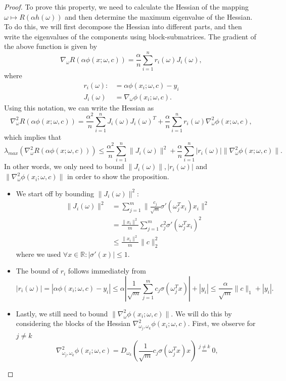 \documentclass[10pt,a4paper]{amsart}
\newcommand{\bR}{\mathbb{R}}
\begin{document}
\begin{proof}
    To prove this property, we need to calculate the Hessian of the mapping $\omega \mapsto R(\alpha h(\omega))$ and then determine the maximum eigenvalue of the Hessian. To do this, we will first decompose the Hessian into different parts, and then write the eigenvalues of the components using block-submatrices. 
    The gradient of the above function is given by
    $$\nabla_\omega R(\alpha \phi(x;\omega,c))=\frac{\alpha}{n}\sum_{i=1}^nr_i(\omega)J_i(\omega),$$
    where 
    \begin{align*}
        r_i(\omega):&=\alpha \phi(x_i;\omega,c)-y_i\\
        J_i(\omega)&=\nabla_\omega \phi(x_i;\omega,c).
    \end{align*}
    Using this notation, we can write the Hessian as 
    $$\nabla^2_\omega R(\alpha \phi(x;\omega,c))=\frac{\alpha^2}{n}\sum_{i=1}^nJ_i(\omega)J_i(\omega)^T+\frac{\alpha}{n}\sum_{i=1}^nr_i(\omega)\nabla^2_\omega\phi(x;\omega,c),$$
    which implies that 
    $$\lambda_{max}\left(\nabla^2_\omega R(\alpha \phi(x;\omega,c))\right)\leq\frac{\alpha^2}{n}\sum_{i=1}^n\|J_i(\omega)\|^2+\frac{\alpha}{n}\sum_{i=1}^n|r_i(\omega)|\|\nabla^2_\omega\phi(x;\omega,c)\|.$$
    In other words, we only need to bound $\|J_i(\omega)\|,|r_i(\omega)|$ and $\|\nabla^2_\omega \phi(x_i;\omega,c)\|$ in order to show the proposition. 
    \begin{itemize}
        \item We start off by bounding $\|J_i(\omega)\|^2$:
        \begin{align*}
            \|J_i(\omega)\|^2&= \sum_{j=1}^m\|\frac{c_j}{\sqrt{m}}\sigma'(\omega_j^T x_i)x_i\|^2\\
            &=\frac{\|x_i\|^2}{m}\sum_{j=1}^mc_j^2\sigma'(\omega_j^Tx_i)^2\\
            &\leq \frac{\|x_i\|^2}{m}\|c\|_2^2
        \end{align*}
        where we used $\forall x\in \bR:|\sigma'(x)|\leq 1$.
        \item The bound of $r_i$ follows immediately from  $$|r_i(\omega)|=|\alpha\phi(x_i;\omega,c)-y_i|\leq \alpha|\frac{1}{\sqrt{m}}\sum_{j=1}^m c_j\sigma(\omega_j^Tx)|+|y_i|\leq \frac{\alpha}{\sqrt{m}}\|c\|_1+|y_i|.$$
        \item Lastly, we still need to bound $\|\nabla^2_\omega \phi(x_i;\omega,c)\|$. We will do this by considering the blocks of the Hessian $\nabla^2_{\omega_j,\omega_k}\phi(x_i;\omega,c)$. First, we observe for $j\neq k$ 
        $$\nabla^2_{\omega_j,\omega_k}\phi(x_i;\omega,c)=D_{\omega_k}\left(\frac{1}{\sqrt{m}}c_j\sigma(\omega_j^Tx)x\right)\overset{j\neq k}{=}0,$$

\end{itemize}
\end{proof}
\end{document}
